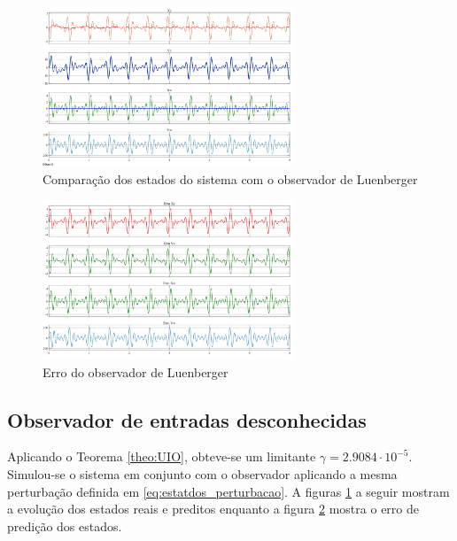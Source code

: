\FloatBarrier
\begin{figure}[htbp]
    \begin{centering}
    \includegraphics[width=7.5cm]{img/estatdos_luenberger.png} 
    \caption{Comparação dos estados do sistema com o observador de Luenberger}
    \label{fig:estatdos_luenberger}
    \end{centering}
\end{figure}
\FloatBarrier

\FloatBarrier
\begin{figure}[htbp]
    \begin{centering}
    \includegraphics[width=7.5cm]{img/estatdos_erro_luenberg.png} 
    \caption{Erro do observador de Luenberger}
    \label{fig:estatdos_erro_luenberg}
    \end{centering}
\end{figure}
\FloatBarrier

\subsection{Observador de entradas desconhecidas}
Aplicando o Teorema \ref{theo:UIO}, obteve-se um limitante $\gamma=2.9084\cdot10^{-5}$. Simulou-se o sistema em conjunto com o observador aplicando a mesma perturbação definida em \eqref{eq:estatdos_perturbacao}.
A figuras \ref{fig:estatdos_luenberger} a seguir mostram a evolução dos estados reais e preditos enquanto a figura \ref{fig:estatdos_erro_luenberg} mostra o erro de predição dos estados.

